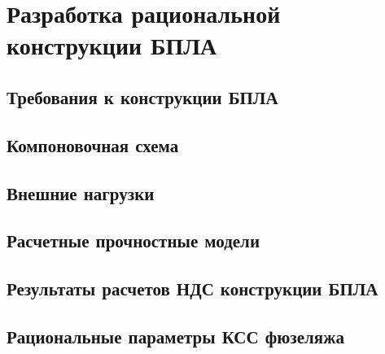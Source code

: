 \chapter{Разработка рациональной конструкции БПЛА}

\section{Требования к конструкции БПЛА}



\section{Компоновочная схема}
	

\section{Внешние нагрузки}
\label{sec:externalLoads}



\section{Расчетные прочностные модели}




\section{Результаты расчетов НДС конструкции БПЛА} 


\section{Рациональные параметры КСС фюзеляжа}
